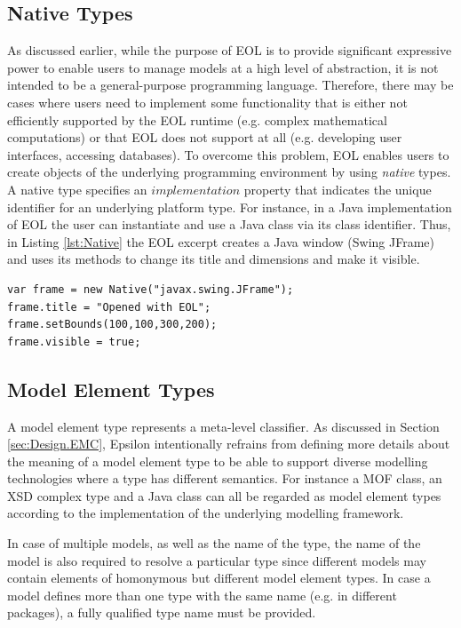 \subsection{Native Types}

As discussed earlier, while the purpose of EOL is to provide significant expressive power to enable users to manage models at a high level of abstraction, it is not intended to be a general-purpose programming language. Therefore, there may be cases where users need to implement some functionality that is either not efficiently supported by the EOL runtime (e.g. complex mathematical computations) or that EOL does not support at all (e.g. developing user interfaces, accessing databases). To overcome this problem, EOL enables users to create objects of the underlying programming environment by using \emph{native} types. A native type specifies an $implementation$ property that indicates the unique identifier for an underlying platform type. For instance, in a Java implementation of EOL the user can instantiate and use a Java class via its class identifier. Thus, in Listing \ref{lst:Native} the EOL excerpt creates a Java window (Swing JFrame) and uses its methods to change its title and dimensions and make it visible.

\begin{lstlisting}[basicstyle=\ttfamily\footnotesize, flexiblecolumns=true, numbers=none, nolol=true, caption=Demonstration of NativeType in EOL, label=lst:Native, numbers=left, language=EOL, tabsize=2]
var frame = new Native("javax.swing.JFrame");
frame.title = "Opened with EOL";
frame.setBounds(100,100,300,200);
frame.visible = true;
\end{lstlisting}

\subsection{Model Element Types}

A model element type represents a meta-level classifier. As discussed in Section \ref{sec:Design.EMC}, Epsilon intentionally refrains from defining more details about the meaning of a model element type to be able to support diverse modelling technologies where a type has different semantics. For instance a MOF class, an XSD complex type and a Java class can all be regarded as model element types according to the implementation of the underlying modelling framework.

In case of multiple models, as well as the name of the type, the name of the model is also required to resolve a particular type since different models may contain elements of homonymous but different model element types. In case a model defines more than one type with the same name (e.g. in different packages), a fully qualified type name must be provided.

